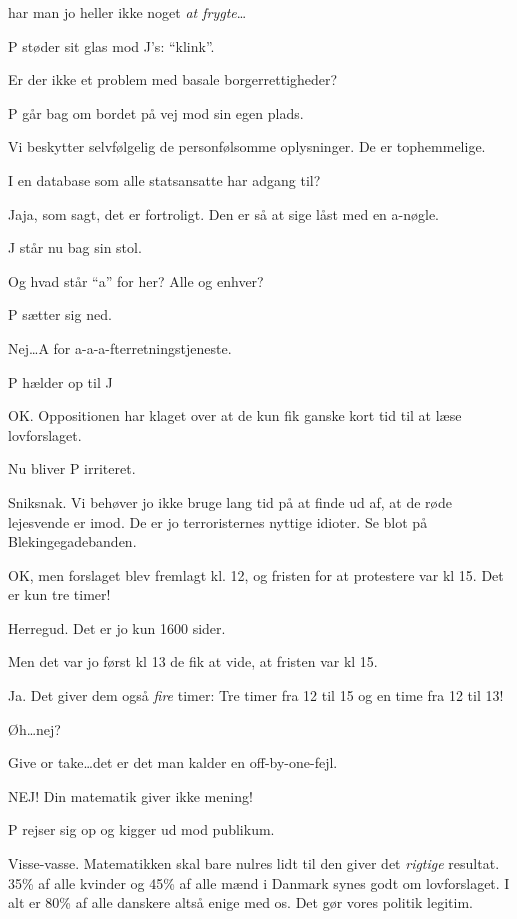 \documentclass[a4paper,11pt]{article}
\begin{document}
\begin{sketch}

 har man jo heller ikke noget  \textit{at frygte}\ldots

\scene P støder sit glas mod J's: ``klink''.

Er der ikke et problem med basale borgerrettigheder?

\scene P går bag om bordet på vej mod sin egen plads.

Vi beskytter selvfølgelig de personfølsomme oplysninger. De er
tophemmelige.

I en database som alle statsansatte har adgang til?

Jaja, som sagt, det er fortroligt. Den er så at sige låst med
en a-nøgle.

\scene J står nu bag sin stol.

Og hvad står ``a'' for her? Alle og enhver?

\scene P sætter sig ned.

Nej\ldots A for a-a-a-fterretningstjeneste.

\scene P hælder op til J

OK. Oppositionen har klaget over at de kun fik ganske kort tid
til at læse lovforslaget.

\scene Nu bliver P irriteret.

Sniksnak. Vi behøver jo ikke bruge lang tid på at finde ud af,
at de røde lejesvende er imod. De er jo terroristernes nyttige
idioter. Se blot på Blekingegadebanden.

OK, men forslaget blev fremlagt kl. 12, og fristen for at
protestere var kl 15. Det er kun tre timer!

Herregud. Det er jo kun 1600 sider.

Men det var jo først kl 13 de fik at vide, at fristen var kl 15.

Ja. Det giver dem også \textit{fire} timer: Tre timer fra 12 til 15
og en time fra 12 til 13!

Øh\ldots nej?

Give or take\ldots det er det man kalder en off-by-one-fejl.

NEJ! Din matematik giver ikke mening!

\scene P rejser sig op og kigger ud mod publikum.

Visse-vasse. Matematikken skal bare nulres lidt til den giver
det \textit{rigtige} resultat. 35\% af alle kvinder og 45\% af alle
mænd i Danmark synes godt om lovforslaget. I alt er 80\% af alle
danskere altså enige med os. Det gør vores politik legitim.


\end{sketch}
\end{document}
